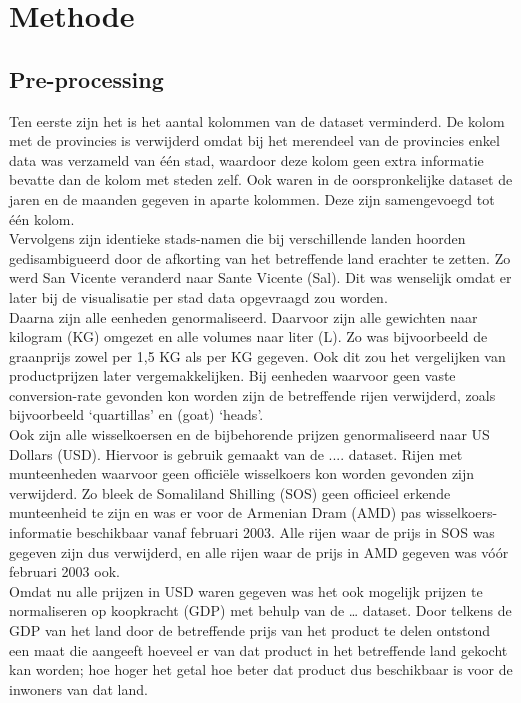 \documentclass{article}
\begin{document}
\section*{Methode}

\subsection*{Pre-processing}
Ten eerste zijn het is het aantal kolommen van de dataset verminderd. De kolom met de provincies is verwijderd omdat bij het merendeel van de provincies enkel data was verzameld van één stad, waardoor deze kolom geen extra informatie bevatte dan de kolom met steden zelf. Ook waren in de oorspronkelijke dataset de jaren en de maanden gegeven in aparte kolommen. Deze zijn samengevoegd tot één kolom.\\

Vervolgens zijn identieke stads-namen die bij verschillende landen hoorden gedisambigueerd door de afkorting van het betreffende land erachter te zetten. Zo werd San Vicente veranderd naar Sante Vicente (Sal).  Dit was wenselijk omdat er later bij de visualisatie per stad data opgevraagd zou worden. \\
 
Daarna zijn alle eenheden genormaliseerd. Daarvoor zijn alle gewichten naar kilogram (KG) omgezet en alle volumes naar liter (L). Zo was bijvoorbeeld de graanprijs zowel per 1,5 KG als per KG gegeven. Ook dit zou het vergelijken van productprijzen later vergemakkelijken. Bij eenheden waarvoor geen vaste conversion-rate gevonden kon worden zijn de betreffende rijen verwijderd, zoals bijvoorbeeld ‘quartillas’ en (goat) ‘heads’.\\

Ook  zijn alle wisselkoersen en de bijbehorende prijzen genormaliseerd naar US Dollars (USD). Hiervoor is gebruik gemaakt van de .... dataset. Rijen met munteenheden waarvoor geen officiële wisselkoers kon worden gevonden zijn verwijderd. Zo bleek de Somaliland Shilling (SOS)  geen officieel erkende munteenheid te zijn en was er voor de Armenian Dram (AMD) pas wisselkoers-informatie beschikbaar vanaf februari 2003. Alle rijen waar de prijs in SOS was gegeven zijn dus verwijderd, en alle rijen waar de prijs in AMD gegeven was vóór februari 2003 ook.\\

Omdat nu alle prijzen in USD waren gegeven was het ook mogelijk prijzen te normaliseren op koopkracht (GDP) met behulp van de … dataset. Door telkens de GDP van het land door de betreffende prijs van het product te delen ontstond een maat die aangeeft hoeveel er van dat product in het betreffende land gekocht kan worden; hoe hoger het getal hoe beter dat product dus beschikbaar is voor de inwoners van dat land. \\
\end{document}
